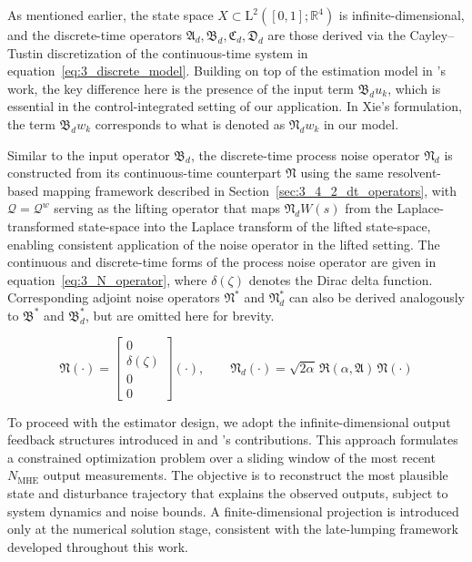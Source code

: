 As mentioned earlier, the state space $X \subset \mathrm{L}^2([0,1]; \mathbb{R}^4)$ is infinite-dimensional, and the discrete-time operators $\mathfrak{A}_d, \mathfrak{B}_d, \mathfrak{C}_d, \mathfrak{D}_d$ are those derived via the Cayley--Tustin discretization of the continuous-time system in equation~\eqref{eq:3_discrete_model}. Building on top of the estimation model in 's work\autocite{xie2022constrained}, the key difference here is the presence of the input term $\mathfrak{B}_d u_k$, which is essential in the control-integrated setting of our application. In Xie's formulation, the term $\mathfrak{B}_d w_k$ corresponds to what is denoted as $\mathfrak{N}_d w_k$ in our model.

Similar to the input operator $\mathfrak{B}_d$, the discrete-time process noise operator $\mathfrak{N}_d$ is constructed from its continuous-time counterpart $\mathfrak{N}$ using the same resolvent-based mapping framework described in Section~\ref{sec:3_4_2_dt_operators}, with $\mathcal{Q} = \mathcal{Q}^w$ serving as the lifting operator that maps $\mathfrak{N}_d W(s)$ from the Laplace-transformed state-space into the Laplace transform of the lifted state-space, enabling consistent application of the noise operator in the lifted setting. The continuous and discrete-time forms of the process noise operator are given in equation~\eqref{eq:3_N_operator}, where $\delta(\zeta)$ denotes the Dirac delta function. Corresponding adjoint noise operators $\mathfrak{N}^\ast$ and $\mathfrak{N}_d^\ast$ can also be derived analogously to $\mathfrak{B}^\ast$ and $\mathfrak{B}_d^\ast$, but are omitted here for brevity.

\begin{equation} \label{eq:3_N_operator}
    \mathfrak{N} (\cdot) = \begin{bmatrix} 0 \\ \delta(\zeta) \\ 0 \\ 0 \end{bmatrix} (\cdot), \qquad \mathfrak{N}_d (\cdot) = \sqrt{2\alpha} \, \mathfrak{R}(\alpha, \mathfrak{A}) \, \mathfrak{N} (\cdot)
\end{equation}

To proceed with the estimator design, we adopt the infinite-dimensional output feedback structures introduced in  and 's contributions\autocite{xie2022constrained, zhang2023tracking}. This approach formulates a constrained optimization problem over a sliding window of the most recent $N_{\mathrm{MHE}}$ output measurements. The objective is to reconstruct the most plausible state and disturbance trajectory that explains the observed outputs, subject to system dynamics and noise bounds. A finite-dimensional projection is introduced only at the numerical solution stage, consistent with the late-lumping framework developed throughout this work.

